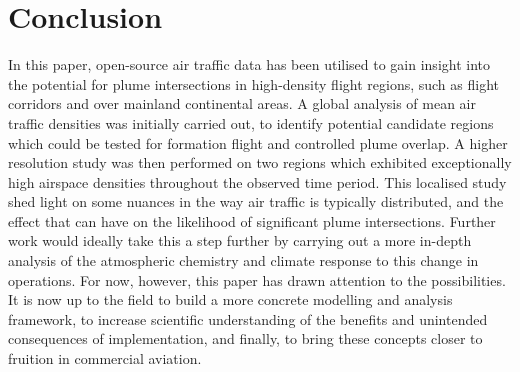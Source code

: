 \section{Conclusion}
In this paper, open-source air traffic data has been utilised to gain insight into the potential for plume intersections in high-density flight regions, such as flight corridors and over mainland continental areas. A global analysis of mean air traffic densities was initially carried out, to identify potential candidate regions which could be tested for formation flight and controlled plume overlap. A higher resolution study was then performed on two regions which exhibited exceptionally high airspace densities throughout the observed time period. This localised study shed light on some nuances in the way air traffic is typically distributed, and the effect that can have on the likelihood of significant plume intersections. Further work would ideally take this a step further by carrying out a more in-depth analysis of the atmospheric chemistry and climate response to this change in operations. For now, however, this paper has drawn attention to the possibilities. It is now up to the field to build a more concrete modelling and analysis framework, to increase scientific understanding of the benefits and unintended consequences of implementation, and finally, to bring these concepts closer to fruition in commercial aviation. 